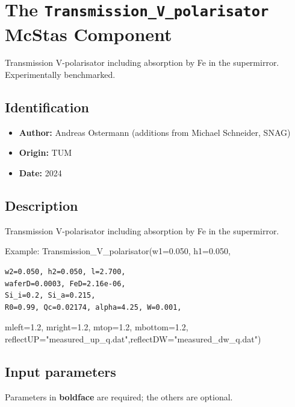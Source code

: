 \section{The \texttt{Transmission\_V\_polarisator} McStas Component}
Transmission V-polarisator including absorption by Fe in the supermirror. Experimentally benchmarked.

\subsection*{Identification}
\begin{itemize}
  \item \textbf{Author:} Andreas Ostermann (additions from Michael Schneider, SNAG)
  \item \textbf{Origin:} TUM
  \item \textbf{Date:} 2024
\end{itemize}

\subsection*{Description}
Transmission V-polarisator including absorption by Fe in the supermirror.

Example: Transmission\_V\_polarisator(w1=0.050, h1=0.050,

\begin{verbatim}
w2=0.050, h2=0.050, l=2.700,
waferD=0.0003, FeD=2.16e-06,
Si_i=0.2, Si_a=0.215,
R0=0.99, Qc=0.02174, alpha=4.25, W=0.001,
\end{verbatim}

mleft=1.2, mright=1.2, mtop=1.2, mbottom=1.2, reflectUP="measured\_up\_q.dat",reflectDW="measured\_dw\_q.dat")

\subsection*{Input parameters}
Parameters in \textbf{boldface} are required; the others are optional.

